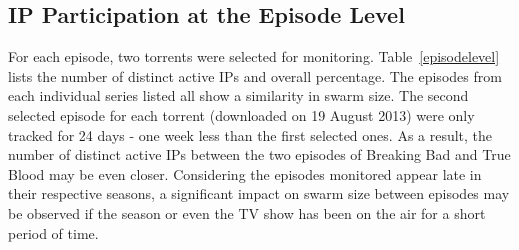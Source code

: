 \documentclass[conference]{IEEEtran}
\begin{document}
\subsection{IP Participation at the Episode Level}

\begin{table}[!h]
\begin{footnotesize}
\renewcommand{\arraystretch}{1.0}
\caption{IP Participation at Episode Level}
\label{episodelevel}
\end{footnotesize}
\end{table}

For each episode, two torrents were selected for monitoring. Table~\ref{episodelevel} lists the number of distinct active IPs and overall percentage. The episodes from each individual series listed all show a similarity in swarm size. The second selected episode for each torrent (downloaded on 19 August 2013) were only tracked for 24 days - one week less than the first selected ones. As a result, the number of distinct active IPs between the two episodes of Breaking Bad and True Blood may be even closer. Considering the episodes monitored appear late in their respective seasons, a significant impact on swarm size between episodes may be observed if the season or even the TV show has been on the air for a short period of time.
\end{document}
